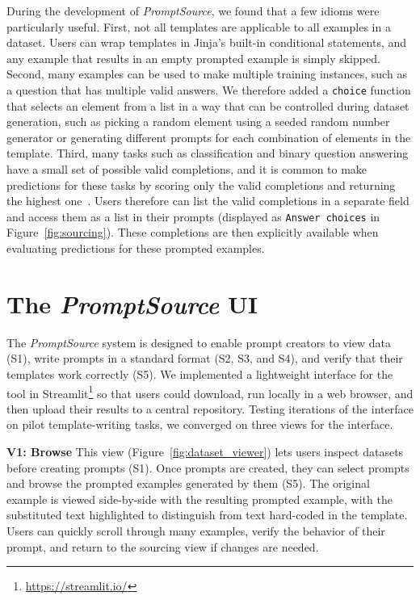 During the development of \textit{PromptSource}, we found that a few idioms were particularly useful. First, not all templates are applicable to all examples in a dataset. Users can wrap templates in Jinja's built-in conditional statements, and any example that results in an empty prompted example is simply skipped. Second, many examples can be used to make multiple training instances, such as a question that has multiple valid answers. We therefore added a \texttt{choice} function that selects an element from a list in a way that can be controlled during dataset generation, such as picking a random element using a seeded random number generator or generating different prompts for each combination of elements in the template. Third, many tasks such as classification and binary question answering have a small set of possible valid completions, and it is common to make predictions for these tasks by scoring only the valid completions and returning the highest one~\citep{brown2020gpt3,sanh2021multitask,wei2021flan}. Users therefore can list the valid completions in a separate field and access them as a list in their prompts (displayed as \texttt{Answer choices} in Figure~\ref{fig:sourcing}). These completions are then explicitly available when evaluating predictions for these prompted examples.

\section{The \textit{PromptSource} UI}

The \textit{PromptSource} system is designed to enable prompt creators to view data (S1), write prompts in a standard format (S2, S3, and S4), and verify that their templates work correctly (S5). We implemented a lightweight interface for the tool in Streamlit\footnote{\url{https://streamlit.io/}} so that users could download, run locally in a web browser, and then upload their results to a central repository. Testing iterations of the interface on pilot template-writing tasks, we converged on three views for the interface. 

\textbf{V1: Browse} This view (Figure~\ref{fig:dataset_viewer}) lets users inspect datasets before creating prompts (S1). Once prompts are created, they can select prompts and browse the prompted examples generated by them (S5). The original example is viewed side-by-side with the resulting prompted example, with the substituted text highlighted to distinguish from text hard-coded in the template. Users can quickly scroll through many examples, verify the behavior of their prompt, and return to the sourcing view if changes are needed.


